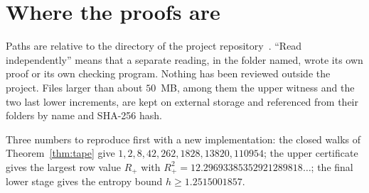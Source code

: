 \section{Where the proofs are}\label{app:where}

Paths are relative to the directory  of the project repository~\cite{Repo}. ``Read
independently'' means that a separate reading, in the folder named, wrote its own proof or its own checking program.
Nothing has been reviewed outside the project. Files larger than about $50$~MB, among them the upper witness and the
two last lower increments, are kept on external storage and referenced from their folders by name and SHA-256 hash.

Three numbers to reproduce first with a new implementation: the closed walks of Theorem~\ref{thm:tape} give
$1,2,8,42,262,1828,13820,110954$; the upper certificate gives the largest row value $R_+$ with
$R_+^2=12.29693385352921289818\ldots$; the final lower stage gives the entropy bound $h\ge1.2515001857$.

